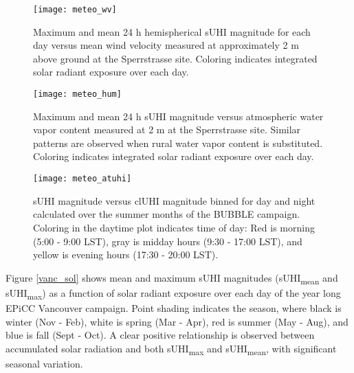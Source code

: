 \begin{bibunit}
\begin{figure}[H]
	\centering
	\texttt{[image: meteo\_wv]}
	\caption{Maximum and mean 24 \si{\hour} hemispherical sUHI magnitude for each day versus mean wind velocity measured at approximately 2 \si{\meter} above ground at the Sperrstrasse site. Coloring indicates integrated solar radiant exposure over each day.}
	\label{meteo_wv}
\end{figure}

\begin{figure}[H]
	\centering
	\texttt{[image: meteo\_hum]}
	\caption{Maximum and mean 24 \si{\hour} sUHI magnitude versus atmospheric water vapor content measured at 2 \si{\meter} at the Sperrstrasse site. Similar patterns are observed when rural water vapor content is substituted. Coloring indicates integrated solar radiant exposure over each day.}
	\label{meteo_hum}
\end{figure}

\begin{figure}[H]
	\centering
	\texttt{[image: meteo\_atuhi]}
	\caption{sUHI magnitude versus clUHI magnitude binned for day and night calculated over the summer months of the BUBBLE campaign.  Coloring in the daytime plot indicates time of day: Red is morning (5:00 - 9:00 LST), gray is midday hours (9:30 - 17:00 LST), and yellow is evening hours (17:30 - 20:00 LST).}
	\label{meteo_atuhi}
\end{figure}


Figure \ref{vanc_sol} shows mean and maximum sUHI magnitudes (sUHI\textsubscript{mean} and sUHI\textsubscript{max}) as a function of solar radiant exposure over each day of the year long EPiCC Vancouver campaign. Point shading indicates the season, where black is winter (Nov - Feb), white is spring (Mar - Apr), red is summer (May - Aug), and blue is fall (Sept - Oct). A clear positive relationship is observed between accumulated solar radiation and both sUHI\textsubscript{max} and sUHI\textsubscript{mean}, with significant seasonal variation. 


\end{bibunit}
